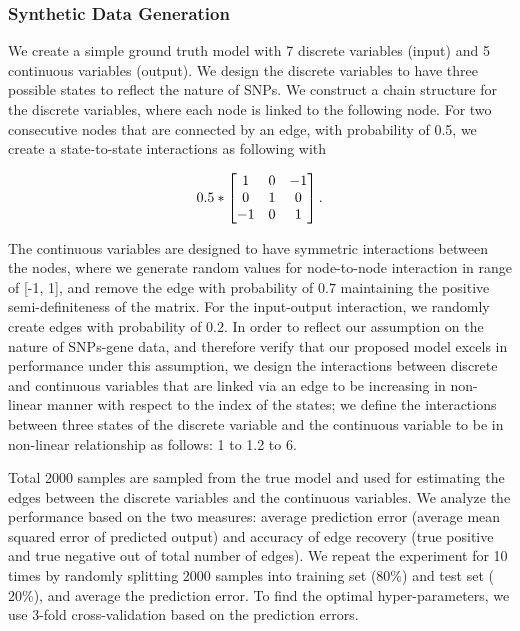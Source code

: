 \documentclass{article}
\begin{document}
\subsubsection{Synthetic Data Generation}
We create a simple ground truth model with 7 discrete variables (input) and 5 continuous variables (output).
We design the discrete variables to have three possible states to reflect the nature of SNPs. We construct a chain structure for the discrete variables, where each node is linked to the following node. For two consecutive nodes that are connected by an edge, with probability of 0.5, we create a state-to-state interactions as following with 

\begin{align*}
\centering
0.5 * 
\begin{bmatrix}
  1 & 0 & -1 \\
  0 & 1 & 0 \\
  -1 & 0 & 1
\end{bmatrix}.
\end{align*}

The continuous variables are designed to have symmetric interactions between the nodes, where we generate random values for node-to-node interaction in range of [-1, 1], and remove the edge with probability of $0.7$ maintaining the positive semi-definiteness of the matrix. 
For the input-output interaction, we randomly create edges with probability of $0.2$. 
In order to reflect our assumption on the nature of SNPs-gene data, and therefore verify that our proposed model excels in performance under this assumption, we design the interactions between discrete and continuous variables that are linked via an edge to be increasing in non-linear manner with respect to the index of the states;
we define the interactions between three states of the discrete variable and the continuous variable to be in non-linear relationship as follows: 1 to 1.2 to 6.



 Total 2000 samples are sampled from the true model and used for estimating the edges between the discrete variables and the continuous variables. 
 We analyze the performance based on the two measures: average prediction error (average mean squared error of predicted output) and accuracy of edge recovery (true positive and true negative out of total number of edges).
We repeat the experiment for 10 times by randomly splitting 2000 samples into training set ($80\%$) and test set ($20\%$), and average the prediction error.
 To find the optimal hyper-parameters, we use 3-fold cross-validation based on the prediction errors.
 
\end{document}
